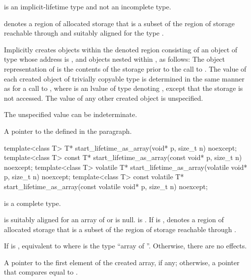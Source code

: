 \begin{itemdescr}
\pnum
\mandates
{} is an implicit-lifetime type
and not an incomplete type.

\pnum
\expects
{} denotes a region of allocated storage
that is
a subset of the region of storage
reachable through  and
suitably aligned for the type .

\pnum
\effects
Implicitly creates objects within the denoted region
consisting of an object  of type 
whose address is , and
objects nested within ,
as follows:
The object representation of 
is the contents of the storage prior to the call to .
The value of each created object 
of trivially copyable type 
is determined in the same manner as for a call
to ,
where  is an lvalue of type  denoting ,
except that the storage is not accessed.
The value of any other created object is unspecified.
\begin{note}
The unspecified value can be indeterminate.
\end{note}

\pnum
\returns
A pointer to the  defined in the  paragraph.
\end{itemdescr}

%
\begin{itemdecl}
template<class T>
  T* start_lifetime_as_array(void* p, size_t n) noexcept;
template<class T>
  const T* start_lifetime_as_array(const void* p, size_t n) noexcept;
template<class T>
  volatile T* start_lifetime_as_array(volatile void* p, size_t n) noexcept;
template<class T>
  const volatile T* start_lifetime_as_array(const volatile void* p, size_t n) noexcept;
\end{itemdecl}

\begin{itemdescr}
\pnum
\mandates
{} is a complete type.

\pnum
\expects
{} is suitably aligned for an array of  or is null.
 is .
If  is ,
 denotes
a region of allocated storage that is
a subset of the region of storage
reachable through .

\pnum
\effects
If  is ,
equivalent to
where  is the type ``array of  ''.
Otherwise, there are no effects.

\pnum
\returns
A pointer to the first element of the created array,
if any;
otherwise,
a pointer that compares equal to .
\end{itemdescr}

